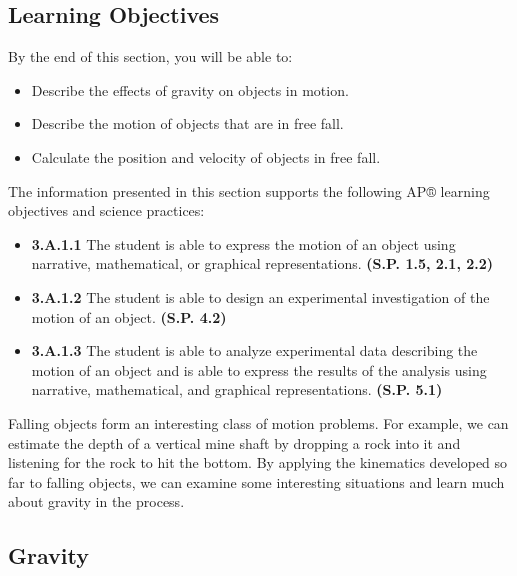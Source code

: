 \documentclass[
]{book}
\providecommand{\tightlist}{%
  \setlength{\itemsep}{0pt}\setlength{\parskip}{0pt}}
\newenvironment{learning-objectives}{}{}
\begin{document}
\hypertarget{fs-id3275688}{}
\begin{learning-objectives}

\hypertarget{learning-objectives-6}{%
\subsection{Learning Objectives}\label{learning-objectives-6}}

By the end of this section, you will be able to:

\begin{itemize}
\tightlist
\item
  Describe the effects of gravity on objects in motion.
\item
  Describe the motion of objects that are in free fall.
\item
  Calculate the position and velocity of objects in free fall.
\end{itemize}

The information presented in this section supports the following AP®
learning objectives and science practices:

\begin{itemize}
\tightlist
\item
  \textbf{3.A.1.1} The student is able to express the motion of an object
  using narrative, mathematical, or graphical representations. \textbf{(S.P.
  1.5, 2.1, 2.2)}
\item
  \textbf{3.A.1.2} The student is able to design an experimental
  investigation of the motion of an object. \textbf{(S.P. 4.2)}
\item
  \textbf{3.A.1.3} The student is able to analyze experimental data
  describing the motion of an object and is able to express the
  results of the analysis using narrative, mathematical, and graphical
  representations. \textbf{(S.P. 5.1)}
\end{itemize}

\end{learning-objectives}

Falling objects form an interesting class of motion problems. For
example, we can estimate the depth of a vertical mine shaft by dropping
a rock into it and listening for the rock to hit the bottom. By applying
the kinematics developed so far to falling objects, we can examine some
interesting situations and learn much about gravity in the process.

\hypertarget{fs-id4178141}{}
\hypertarget{gravity}{%
\subsection{Gravity}\label{gravity}}
\end{document}
